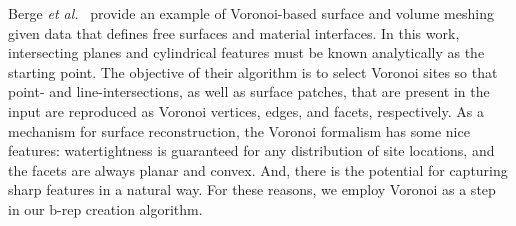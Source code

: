 Berge \textit{et al.}~\cite{berge2019} provide an example of Voronoi-based surface and volume meshing given data that defines free surfaces and material interfaces.  In this work, intersecting planes and cylindrical features must be known analytically as the starting point. The objective of their algorithm is to select Voronoi sites so that point- and line-intersections, as well as surface patches, that are present in the input are reproduced as Voronoi vertices, edges, and facets, respectively.  As a mechanism for surface reconstruction, the Voronoi formalism has some nice features:  watertightness is guaranteed for any distribution of site locations, and the facets are always planar and convex.  And, there is the potential for capturing sharp features in a natural way.  For these reasons, we employ Voronoi as a step in our b-rep creation algorithm. \\ \\
%
